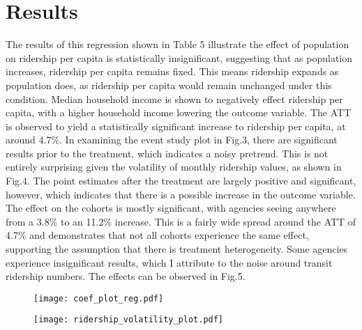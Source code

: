 \documentclass [12pt]{report}
\begin{document}
\section*{Results}
The results of this regression shown in Table 5 illustrate the effect of population on ridership per capita is statistically insignificant, suggesting that as population increases, ridership per capita remains fixed. This means ridership expands as population does, as ridership per capita would remain unchanged under this condition. Median household income is shown to negatively effect ridership per capita, with a higher household income lowering the outcome variable. The ATT is observed to yield a statistically significant increase to ridership per capita, at around 4.7\%. In examining the event study plot in Fig.3, there are significant results prior to the treatment, which indicates a noisy pretrend. This is not entirely surprising given the volatility of monthly ridership values, as shown in Fig.4. The point estimates after the treatment are largely positive and significant, however, which indicates that there is a possible increase in the outcome variable.\\
\indent The effect on the cohorts is mostly significant, with agencies seeing anywhere from a 3.8\% to an 11.2\% increase. This is a fairly wide spread around the ATT of 4.7\% and demonstrates that not all cohorts experience the same effect, supporting the assumption that there is treatment heterogeneity. Some agencies experience insignificant results, which I attribute to the noise around transit ridership numbers. The effects can be observed in Fig.5.

\begin{figure}[H]
\centering
  \centering
  \texttt{[image: coef\_plot\_reg.pdf]}
  \label{fig:test1}
\end{figure}
\begin{figure}[H]
  \centering
  \texttt{[image: ridership\_volatility\_plot.pdf]}
  \label{fig:test2}
\end{figure}
\end{document}

